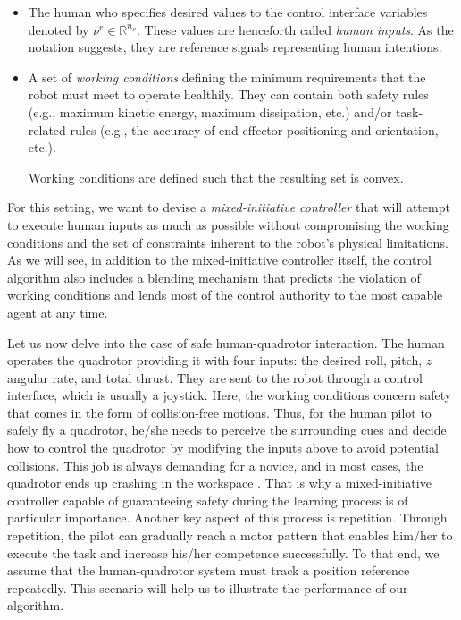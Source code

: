 \begin{itemize}
	\item The human who specifies desired values to the control interface variables denoted by $\nu^r \in \mathbb{R}^{n_\nu}$. These values are henceforth called \emph{human inputs}. As the notation suggests, they are reference signals representing human intentions.
	\item A set of \emph{working conditions} defining the minimum requirements that the robot must meet to operate healthily. They can contain both safety rules (e.g., maximum kinetic energy, maximum dissipation, etc.) and/or task-related rules (e.g., the accuracy of end-effector positioning and orientation, etc.).
	\begin{assumption}
		Working conditions are defined such that the resulting set is convex.
	\end{assumption}
\end{itemize}
For this setting, we want to devise a \emph{mixed-initiative controller} that will attempt to execute human inputs as much as possible without compromising the working conditions and the set of constraints inherent to the robot's physical limitations. As we will see, in addition to the mixed-initiative controller itself, the control algorithm also includes a blending mechanism that predicts the violation of working conditions and lends most of the control authority to the most capable agent at any time.

Let us now delve into the case of safe human-quadrotor interaction. The human operates the quadrotor providing it with four inputs: the desired roll, pitch, $z$ angular rate, and total thrust. They are sent to the robot through a control interface, which is usually a joystick. Here, the working conditions concern safety that comes in the form of collision-free motions. Thus, for the human pilot to safely fly a quadrotor, he/she needs to perceive the surrounding cues and decide how to control the quadrotor by modifying the inputs above to avoid potential collisions. This job is always demanding for a novice, and in most cases, the quadrotor ends up crashing in the workspace \cite{xu2018}. That is why a mixed-initiative controller capable of guaranteeing safety during the learning process is of particular importance. Another key aspect of this process is repetition. Through repetition, the pilot can gradually reach a motor pattern that enables him/her to execute the task and increase his/her competence successfully. To that end, we assume that the human-quadrotor system must track a position reference repeatedly. This scenario will help us to illustrate the performance of our algorithm.   
  
